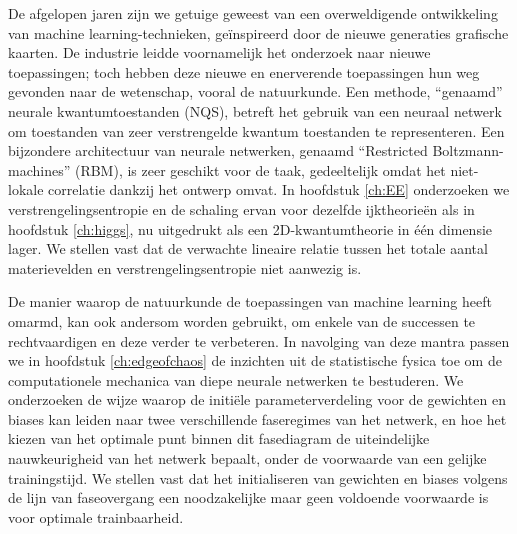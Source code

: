 De afgelopen jaren zijn we getuige geweest van een overweldigende ontwikkeling van machine learning-technieken, geïnspireerd door de nieuwe generaties grafische kaarten. De industrie leidde voornamelijk het onderzoek naar nieuwe toepassingen; toch hebben deze nieuwe en enerverende toepassingen hun weg gevonden naar de wetenschap, vooral de natuurkunde. Een methode, ``genaamd'' neurale kwantumtoestanden (NQS), betreft het gebruik van een neuraal netwerk om toestanden van zeer verstrengelde kwantum toestanden te representeren. Een bijzondere architectuur van neurale netwerken, genaamd ``Restricted Boltzmann-machines'' (RBM), is zeer geschikt voor de taak, gedeeltelijk omdat het niet-lokale correlatie dankzij het ontwerp omvat. In hoofdstuk \ref{ch:EE} onderzoeken we verstrengelingsentropie en de schaling ervan voor dezelfde ijktheorieën als in hoofdstuk \ref{ch:higgs}, nu uitgedrukt als een 2D-kwantumtheorie in één dimensie lager. We stellen vast dat de verwachte lineaire relatie tussen het totale aantal materievelden en verstrengelingsentropie niet aanwezig is.

De manier waarop de natuurkunde de toepassingen van machine learning heeft omarmd, kan ook andersom worden gebruikt, om enkele van de successen te rechtvaardigen en deze verder te verbeteren. In navolging van deze mantra passen we in hoofdstuk \ref{ch:edgeofchaos} de inzichten uit de statistische fysica toe om de computationele mechanica van diepe neurale netwerken te bestuderen. We onderzoeken de wijze waarop de initiële parameterverdeling voor de gewichten en biases kan leiden naar twee verschillende faseregimes van het netwerk, en hoe het kiezen van het optimale punt binnen dit fasediagram de uiteindelijke nauwkeurigheid van het netwerk bepaalt, onder de voorwaarde van een gelijke trainingstijd. We stellen vast dat het initialiseren van gewichten en biases volgens de lijn van faseovergang een noodzakelijke maar geen voldoende voorwaarde is voor optimale trainbaarheid.




\newpage
\thispagestyle{empty}